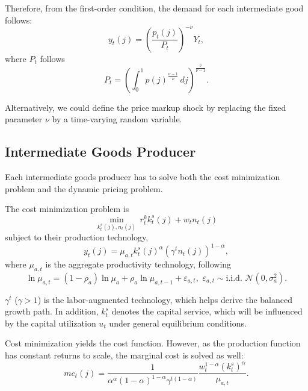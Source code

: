    Therefore, from the first-order condition, the demand for each intermediate good follows:
    \begin{equation}
        y_t(j) = \left(\frac{p_t(j)}{P_t}\right)^{-\nu} Y_t,
    \end{equation}
    where $P_t$ follows
    \begin{equation}
        P_t = \left(\int_{0}^{1} p(j)^{\frac{\nu - 1}{\nu}}\, dj\right)^{\frac{\nu}{\nu - 1}}.
    \end{equation}

    Alternatively, we could define the price markup shock by replacing the fixed parameter $\nu$ by a time-varying random variable.

    \subsection{Intermediate Goods Producer}
    Each intermediate goods producer has to solve both the cost minimization problem and the dynamic pricing problem.
    
    The cost minimization problem is
    \begin{equation}
        \min\limits_{k^s_t(j), n_t(j)}\, r_t^k k^s_t(j) + w_t n_t(j)
    \end{equation}
    subject to their production technology,
    \begin{equation}
        y_t(j) = \mu_{a, t} k^s_t(j)^{\alpha}\left(\gamma^t n_t(j)\right)^{1-\alpha},
    \end{equation}
    where $\mu_{a, t}$ is the aggregate productivity technology, following
    \begin{equation}
        \ln \mu_{a, t} = (1 - \rho_a) \ln \mu_{a} + \rho_a \ln \mu_{a, t-1} + \varepsilon_{a, t}, \,\, \varepsilon_{a, t} \sim \text{i.i.d. } \mathcal{N}(0, \sigma_a^2).
    \end{equation}

    $\gamma^t$ ($\gamma>1$) is the labor-augmented technology, which helps derive the balanced growth path. In addition, $k^s_t$ denotes the capital service, which will be influenced by the capital utilization $u_t$ under general equilibrium conditions.

    Cost minimization yields the cost function. However, as the production function has constant returns to scale, the marginal cost is solved as well:
    \begin{equation}
        mc_t(j) = \frac{1}{\alpha^\alpha (1-\alpha)^{1-\alpha} \gamma^{t(1-\alpha)}}\frac{w_t^{1-\alpha} (k_t^s)^{\alpha}}{\mu_{a,t}}.
    \end{equation}

